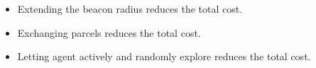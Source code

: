 \documentclass[../main.tex]{subfiles}
\begin{document}
\begin{itemize}
	\item Extending the beacon radius reduces the total cost.
	\item Exchanging parcels reduces the total cost.
	\item Letting agent actively and randomly explore reduces the total cost.
\end{itemize}
\end{document}
